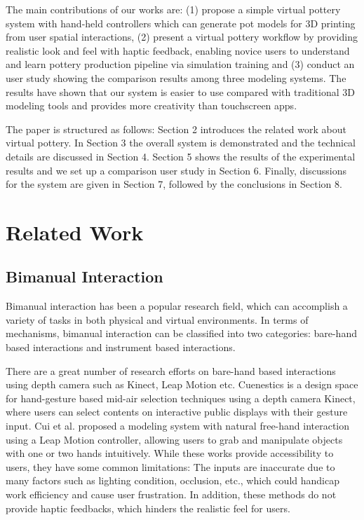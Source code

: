 \documentclass{svjour3}                     %
\begin{document}
The main contributions of our works are:
%
(1) propose a simple virtual pottery system with hand-held controllers which can generate pot models for 3D printing from user spatial interactions,
%
(2) present a virtual pottery workflow by providing realistic look and feel with haptic feedback, enabling novice users to understand and learn pottery production pipeline via simulation training 
%
and (3) conduct an user study showing the comparison results among three modeling systems. The results have shown that our system is easier to use compared with traditional 3D modeling tools and provides more creativity than touchscreen apps.

The paper is structured as follows:
Section 2 introduces the related work about virtual pottery.
In Section 3 the overall system is demonstrated and the technical details are discussed in Section 4.
Section 5 shows the results of the experimental results and we set up a comparison user study in Section 6.
Finally, discussions for the system are given in Section 7, followed by the conclusions in Section 8.

\section{Related Work}
\label{sec:2}

\subsection{Bimanual Interaction}
\label{sec:2.1}
Bimanual interaction has been a popular research field, which can accomplish a variety of tasks in both physical and virtual environments.
In terms of mechanisms, bimanual interaction can be classified into two categories: bare-hand based interactions and instrument based interactions.

There are a great number of research efforts \cite{walter2014cuenesics,cui2016exploration,ramani2015gesture,murugappan2013handy,han2014virtual} on bare-hand based interactions using depth camera such as Kinect, Leap Motion etc.
Cuenestics \cite{walter2014cuenesics} is a design space for hand-gesture based mid-air selection techniques using a depth camera Kinect, where users can select contents on interactive public displays with their gesture input.
Cui et al. \cite{cui2016exploration} proposed a modeling system with natural free-hand interaction using a Leap Motion controller, allowing users to grab and manipulate objects with one or two hands intuitively.
While these works provide accessibility to users, they have some common limitations: The inputs are inaccurate due to many factors such as lighting condition, occlusion, etc., which could handicap work efficiency and cause user frustration.
In addition, these methods do not provide haptic feedbacks, which hinders the realistic feel for users.
\end{document}
